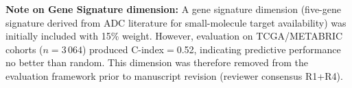 \textbf{Note on Gene Signature dimension:} A gene signature dimension (five-gene signature derived from ADC literature for small-molecule target availability) was initially included with 15\% weight. However, evaluation on TCGA/METABRIC cohorts ($n{=}3\,064$) produced C-index$=$0.52, indicating predictive performance no better than random. This dimension was therefore removed from the evaluation framework prior to manuscript revision (reviewer consensus R1+R4).